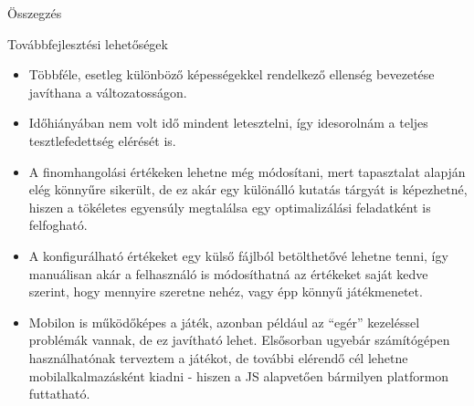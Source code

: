\begin{MyChapter}{Összegzés}
\begin{MySection}{Továbbfejlesztési lehetőségek}
\begin{itemize}
			\item Többféle, esetleg különböző képességekkel rendelkező ellenség bevezetése javíthana a változatosságon.
			
			\item Időhiányában nem volt idő mindent letesztelni, így idesorolnám a teljes tesztlefedettség elérését is.
			
			\item A finomhangolási értékeken lehetne még módosítani, mert tapasztalat alapján elég könnyűre sikerült, de ez akár egy különálló kutatás tárgyát is képezhetné, hiszen a tökéletes egyensúly megtalálsa egy optimalizálási feladatként is felfogható.
			
			\item A konfigurálható értékeket egy külső fájlból betölthetővé lehetne tenni, így manuálisan akár a felhasználó is módosíthatná az értékeket saját kedve szerint, hogy mennyire szeretne nehéz, vagy épp könnyű játékmenetet.
			
			\item Mobilon is működőképes a játék, azonban például az ``egér'' kezeléssel problémák vannak, de ez javítható lehet. Elsősorban ugyebár számítógépen használhatónak terveztem a játékot, de további elérendő cél lehetne mobilalkalmazásként kiadni - hiszen a JS alapvetően bármilyen platformon futtatható.
		\end{itemize}
		
	\end{MySection}
	
	
	
	
\end{MyChapter}